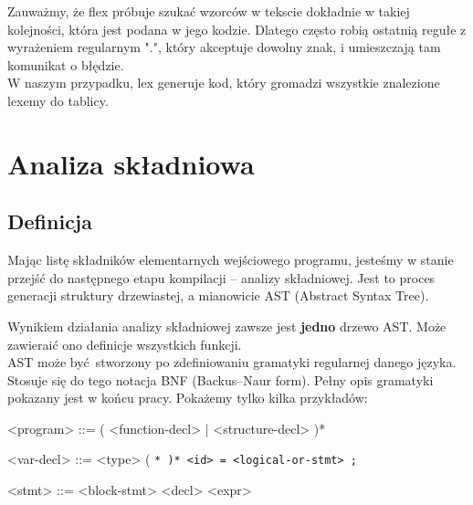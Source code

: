 \documentclass[leqno, 12pt]{article}
\newcommand{\spacing}{\vskip 0.5cm}
\begin{document}
		\spacing
		
		Zauważmy, że flex próbuje szukać wzorców w tekscie dokładnie w takiej kolejności, która jest podana w
		jego kodzie. Dlatego często robią ostatnią regułe z wyrażeniem regularnym ".", który akceptuje
		dowolny znak, i umieszczają tam komunikat o błędzie.
		\\

		W naszym przypadku, lex generuje kod, który gromadzi wszystkie znalezione lexemy do tablicy.

		\newpage

	\section{Analiza składniowa}
		
		\subsection{Definicja}

			Mając listę składników elementarnych wejściowego programu, jesteśmy w stanie przejść do
			następnego etapu kompilacji -- analizy składniowej. Jest to proces generacji struktury
			drzewiastej, a mianowicie AST (Abstract Syntax Tree).
			\spacing
			
			Wynikiem działania analizy składniowej zawsze jest \textbf{jedno} drzewo AST. Może zawieraić ono
			definicje wszystkich funkcji.
			\\
		
			AST może być stworzony po zdefiniowaniu gramatyki regularnej danego języka. Stosuje się
			do tego notacja BNF (Backus–Naur form). Pełny opis gramatyki pokazany jest w końcu pracy. Pokażemy
			tylko kilka przykładów:
			
			\spacing

		    \setlength{\grammarindent}{12em}

		    \begin{grammar}
		        <program> ::= ( <function-decl> | <structure-decl> )*

		        <var-decl> ::= <type> ( \tt{*} )* <id> \tt{=} <logical-or-stmt> \tt{;}

		        <stmt> ::= <block-stmt>
		        \alt <selection-stmt>
		        \alt <iteration-stmt>
		        \alt <jump-stmt>
		        \alt <assignment-stmt>
		        \alt <primary-stmt>
			\end{grammar}
			
			\spacing
			
\end{document}
